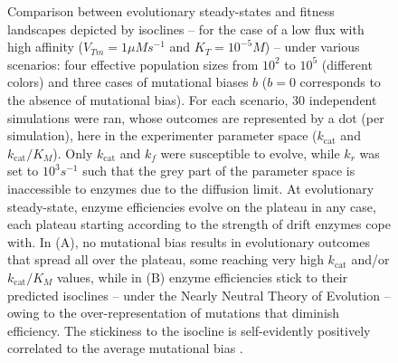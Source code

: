 \begin{figure}[h!]
\begin{minipage}[c]{0.48\linewidth}
\end{minipage}
\caption{Comparison between evolutionary steady-states and fitness landscapes depicted by isoclines -- for the case of a low flux with high affinity ($V_{Tm}=1\mu Ms^{-1}$ and $K_T=10^{-5}M$) -- under various scenarios: four effective population sizes from $10^2$ to $10^5$ (different colors) and three cases of mutational biases %
$b$ ($b=0$ corresponds to the absence of mutational bias). For each scenario, 30 independent simulations were ran, whose outcomes are represented by a dot (per simulation), here in the experimenter parameter space ($k_\text{cat}$ and $k_\text{cat}/K_M$). Only $k_\text{cat}$ and $k_f$ were susceptible to evolve, while $k_r$ was set to $10^3s^{-1}$ such that the grey part of the parameter space is inaccessible to enzymes due to the diffusion limit. At evolutionary steady-state, enzyme efficiencies evolve on the plateau in any case, each plateau starting according to the strength of drift enzymes cope with. In (A), no mutational bias results in evolutionary outcomes that spread all over the plateau, some reaching very high $k_\text{cat}$ and/or $k_\text{cat}/K_M$ values, while in (B) enzyme efficiencies stick to their predicted isoclines -- under the Nearly Neutral Theory of Evolution \citep{Ohta92} -- owing to the over-representation of mutations that diminish efficiency. The stickiness to the isocline is self-evidently positively correlated to the average mutational bias%
.}
\label{fig7low-ann}
\end{figure}

